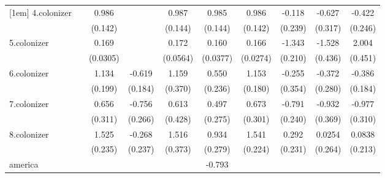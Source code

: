 {\begin{tabular}{l*{9}{c}}
[1em]
4.colonizer &                     &       0.986\sym{***}&                     &       0.987\sym{***}&       0.985\sym{***}&       0.986\sym{***}&      -0.118         &      -0.627\sym{*}  &      -0.422\sym{*}  \\
            &                     &     (0.142)         &                     &     (0.144)         &     (0.144)         &     (0.142)         &     (0.239)         &     (0.317)         &     (0.246)         \\
[1em]
5.colonizer &                     &       0.169\sym{***}&                     &       0.172\sym{***}&       0.160\sym{***}&       0.166\sym{***}&      -1.343\sym{***}&      -1.528\sym{***}&       2.004\sym{***}\\
            &                     &    (0.0305)         &                     &    (0.0564)         &    (0.0377)         &    (0.0274)         &     (0.210)         &     (0.436)         &     (0.451)         \\
[1em]
6.colonizer &                     &       1.134\sym{***}&      -0.619\sym{***}&       1.159\sym{***}&       0.550\sym{**} &       1.153\sym{***}&      -0.255         &      -0.372         &      -0.386\sym{**} \\
            &                     &     (0.199)         &     (0.184)         &     (0.370)         &     (0.236)         &     (0.180)         &     (0.354)         &     (0.280)         &     (0.184)         \\
[1em]
7.colonizer &                     &       0.656\sym{**} &      -0.756\sym{***}&       0.613         &       0.497\sym{*}  &       0.673\sym{**} &      -0.791\sym{***}&      -0.932\sym{**} &      -0.977\sym{***}\\
            &                     &     (0.311)         &     (0.266)         &     (0.428)         &     (0.275)         &     (0.301)         &     (0.240)         &     (0.369)         &     (0.310)         \\
[1em]
8.colonizer &                     &       1.525\sym{***}&      -0.268         &       1.516\sym{***}&       0.934\sym{***}&       1.541\sym{***}&       0.292         &      0.0254         &      0.0838         \\
            &                     &     (0.235)         &     (0.237)         &     (0.373)         &     (0.279)         &     (0.224)         &     (0.231)         &     (0.264)         &     (0.213)         \\
[1em]
america     &                     &                     &                     &                     &      -0.793         &                     &                     &                     &                     \\

\end{tabular}}
